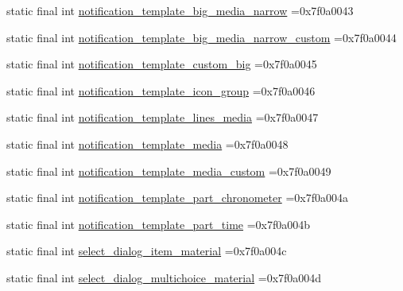 \begin{DoxyCompactItemize}
\item 
static final int \mbox{\hyperlink{classbr_1_1unb_1_1cic_1_1mp_1_1marketmaster_1_1R_1_1layout_addd040d12888db2b1df558de8e2ca186}{notification\+\_\+template\+\_\+big\+\_\+media\+\_\+narrow}} =0x7f0a0043
\item 
static final int \mbox{\hyperlink{classbr_1_1unb_1_1cic_1_1mp_1_1marketmaster_1_1R_1_1layout_a7bc73a7b797f965f8ae23be0dfe99cfa}{notification\+\_\+template\+\_\+big\+\_\+media\+\_\+narrow\+\_\+custom}} =0x7f0a0044
\item 
static final int \mbox{\hyperlink{classbr_1_1unb_1_1cic_1_1mp_1_1marketmaster_1_1R_1_1layout_afa39e7653bae7a0bb9b37f8bd599ae28}{notification\+\_\+template\+\_\+custom\+\_\+big}} =0x7f0a0045
\item 
static final int \mbox{\hyperlink{classbr_1_1unb_1_1cic_1_1mp_1_1marketmaster_1_1R_1_1layout_a2b126dd3a49e5077cc3a8ae35b24287a}{notification\+\_\+template\+\_\+icon\+\_\+group}} =0x7f0a0046
\item 
static final int \mbox{\hyperlink{classbr_1_1unb_1_1cic_1_1mp_1_1marketmaster_1_1R_1_1layout_a58b65fc02bd74d884e735d5a5b6e8133}{notification\+\_\+template\+\_\+lines\+\_\+media}} =0x7f0a0047
\item 
static final int \mbox{\hyperlink{classbr_1_1unb_1_1cic_1_1mp_1_1marketmaster_1_1R_1_1layout_a5c9381c6f92fb91415451214a90050d7}{notification\+\_\+template\+\_\+media}} =0x7f0a0048
\item 
static final int \mbox{\hyperlink{classbr_1_1unb_1_1cic_1_1mp_1_1marketmaster_1_1R_1_1layout_aa13c3ab064ca6ad3d3b130a3d2434c5b}{notification\+\_\+template\+\_\+media\+\_\+custom}} =0x7f0a0049
\item 
static final int \mbox{\hyperlink{classbr_1_1unb_1_1cic_1_1mp_1_1marketmaster_1_1R_1_1layout_aa30b2870ad1d622f10011c1e98fefffb}{notification\+\_\+template\+\_\+part\+\_\+chronometer}} =0x7f0a004a
\item 
static final int \mbox{\hyperlink{classbr_1_1unb_1_1cic_1_1mp_1_1marketmaster_1_1R_1_1layout_a9f667d6926d97c2079be22b6d2a04f30}{notification\+\_\+template\+\_\+part\+\_\+time}} =0x7f0a004b
\item 
static final int \mbox{\hyperlink{classbr_1_1unb_1_1cic_1_1mp_1_1marketmaster_1_1R_1_1layout_a69ebabfe41ba252c5650df472fe330df}{select\+\_\+dialog\+\_\+item\+\_\+material}} =0x7f0a004c
\item 
static final int \mbox{\hyperlink{classbr_1_1unb_1_1cic_1_1mp_1_1marketmaster_1_1R_1_1layout_af074a3c26bc4a1accf84aa6867ed50d4}{select\+\_\+dialog\+\_\+multichoice\+\_\+material}} =0x7f0a004d

\end{DoxyCompactItemize}
